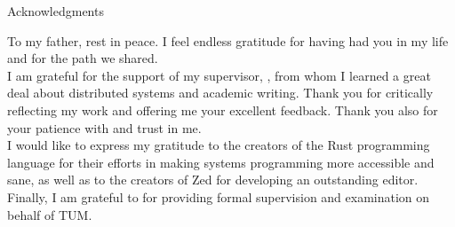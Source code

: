 \thispagestyle{empty}

\vspace*{20mm}

\begin{center}
    { Acknowledgments}
\end{center}

\vspace{10mm}

To my father, rest in peace.
I feel endless gratitude for having had you in my life and for the path we shared.\\

I am grateful for the support of my supervisor, \getAdvisor{},
from whom I learned a great deal about distributed systems and academic writing.
Thank you for critically reflecting my work and offering me your excellent feedback.
Thank you also for your patience with and trust in me.\\

I would like to express my gratitude to the creators of the Rust programming language
for their efforts in making systems programming more accessible and sane,
as well as to the creators of Zed for developing an outstanding editor.\\

Finally, I am grateful to \getSupervisor{} for providing formal supervision
and examination on behalf of TUM.

\cleardoublepage{}
